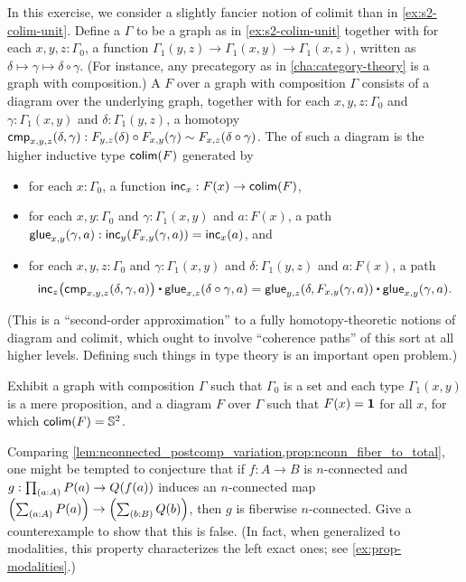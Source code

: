 \documentclass[hott-all.tex]{subfiles}
\begin{document}
\begin{ex}
  In this exercise, we consider a slightly fancier notion of colimit than in \cref{ex:s2-colim-unit}.
  Define a  $\Gamma$ to be a graph as in \cref{ex:s2-colim-unit} together with for each $x,y,z:\Gamma_0$, a function $\Gamma_1(y,z) \to \Gamma_1(x,y) \to \Gamma_1(x,z)$, written as $\delta\mapsto\gamma \mapsto \delta \circ \gamma$.
  (For instance, any precategory as in \cref{cha:category-theory} is a graph with composition.)
  A  $F$ over a graph with composition $\Gamma$ consists of a diagram over the underlying graph, together with for each $x,y,z:\Gamma_0$ and $\gamma:\Gamma_1(x,y)$ and $\delta:\Gamma_1(y,z)$, a homotopy $\mathsf{cmp}_{x,y,z}(\delta,\gamma) : F_{y,z}(\delta) \circ F_{x,y}(\gamma) \sim F_{x,z}(\delta\circ\gamma)$.
  The  of such a diagram is the higher inductive type $\mathsf{colim}(F)$ generated by
  \begin{itemize}
  \item for each $x:\Gamma_0$, a function $\mathsf{inc}_x:F(x) \to \mathsf{colim}(F)$,
  \item for each $x,y:\Gamma_0$ and $\gamma:\Gamma_1(x,y)$ and $a:F(x)$, a path $\mathsf{glue}_{x,y}(\gamma,a) : \mathsf{inc}_y(F_{x,y}(\gamma,a)) = \mathsf{inc}_x(a)$, and
  \item for each $x,y,z:\Gamma_0$ and $\gamma:\Gamma_1(x,y)$ and $\delta:\Gamma_1(y,z)$ and $a:F(x)$, a path
    \[ \ap{\inc_z}{\cmp_{x,y,z}(\delta,\gamma,a)} \ct \glue_{x,z}(\delta\circ \gamma,a) = \glue_{y,z}(\delta,F_{x,y}(\gamma,a)) \ct \glue_{x,y}(\gamma,a). \]
  \end{itemize}
  (This is a ``second-order approximation'' to a fully homotopy-theoretic notions of diagram and colimit, which ought to involve ``coherence paths'' of this sort at all higher levels.
  Defining such things in type theory is an important open problem.)

  Exhibit a graph with composition $\Gamma$ such that $\Gamma_0$ is a set and each type $\Gamma_1(x,y)$ is a mere proposition, and a diagram $F$ over $\Gamma$ such that $F(x)=\mathbf{1}$ for all $x$, for which $\mathsf{colim}(F)=\mathbb{S}^2$.
\end{ex}

\begin{ex}
  Comparing \cref{lem:nconnected_postcomp_variation,prop:nconn_fiber_to_total}, one might be tempted to conjecture that if $f:A\to B$ is $n$-connected and $g:\prd{a:A} P(a) \to Q(f(a))$ induces an $n$-connected map $\Parens{\sm{a:A} P(a)} \to \Parens{\sm{b:B} Q(b)}$, then $g$ is fiberwise $n$-connected.
  Give a counterexample to show that this is false.
  (In fact, when generalized to modalities, this property characterizes the left exact ones; see \cref{ex:prop-modalities}.)
\end{ex}
\end{document}
